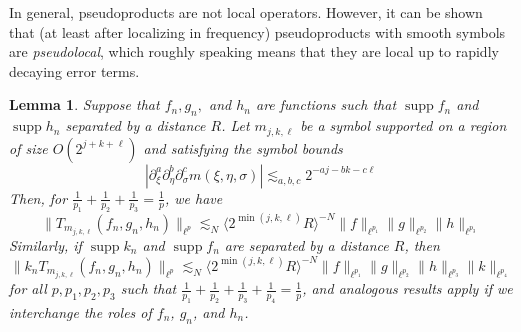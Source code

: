 \documentclass[letterpaper, reqno,final]{amsart}
\DeclareMathOperator{\supp}{supp}
\newcommand{\jBra}[1]{\langle #1 \rangle}
\newtheorem{lemma}[thm]{Lemma}
\begin{document}
In general, pseudoproducts are not local operators.  However, it can be shown that (at least after localizing in frequency) pseudoproducts with smooth symbols are \emph{pseudolocal}, which roughly speaking means that they are local up to rapidly decaying error terms.
\begin{lemma}\label{thm:pseudolocality-lemma}
    Suppose that $f_n,g_n,$ and $h_n$ are functions such that $\supp f_n$ and $\supp h_n$ separated by a distance $R$.  Let $m_{j,k,\ell}$ be a symbol supported on a region of size $O(2^{j+k+\ell})$ and satisfying the symbol bounds
\begin{equation*}
    |\partial_{\xi}^a \partial_\eta^b \partial_\sigma^c m(\xi,\eta,\sigma)| \lesssim_{a,b,c} 2^{-aj - bk - c\ell}
\end{equation*}
  Then, for $\frac{1}{p_1} + \frac{1}{p_2} + \frac{1}{p_3} = \frac{1}{p}$, we have
\begin{equation}\label{eqn:pseudoloc-1}
    \lVert T_{m_{j,k,\ell}}(f_n,g_n,h_n)  \rVert_{\ell^p} \lesssim_N \jBra{2^{\min(j,k,\ell)} R}^{-N} \lVert f \rVert_{\ell^{p_1}} \lVert g \rVert_{\ell^{p_2}} \lVert h \rVert_{\ell^{p_3}}
\end{equation}
Similarly, if $\supp k_n$ and $\supp f_n$ are separated by a distance $R$, then
\begin{equation}\label{eqn:pseudoloc-2}
    \lVert k_nT_{m_{j,k,\ell}}(f_n,g_n,h_n)  \rVert_{\ell^p} \lesssim_N \jBra{2^{\min(j,k,\ell)} R}^{-N} \lVert f \rVert_{\ell^{p_1}} \lVert g \rVert_{\ell^{p_2}} \lVert h \rVert_{\ell^{p_3}} \lVert k \rVert_{\ell^{p_4}}
\end{equation}
for all $p, p_1, p_2, p_3$ such that $\frac{1}{p_1} + \frac{1}{p_2} + \frac{1}{p_3} + \frac{1}{p_4} = \frac{1}{p}$, and analogous results apply if we interchange the roles of $f_n$, $g_n$, and $h_n$.
\end{lemma}
\end{document}
